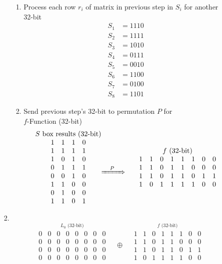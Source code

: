 \documentclass[12pt]{article}
\begin{document}
\begin{enumerate}
\begin{enumerate}
\begin{enumerate}
\begin{enumerate}
				\item
					Process each row $r_i$ of matrix in previous step in $S_i$ for another 32-bit
					\begin{align*}
					S_1 &= 1110\\
					S_2 &= 1111\\
					S_3 &= 1010\\
					S_4 &= 0111\\
					S_5 &= 0010\\
					S_6 &= 1100\\
					S_7 &= 0100\\
					S_8 &= 1101
					\end{align*}
					
				\item
					Send previous step's 32-bit to permutation $P$ for \\
					$f$-Function (32-bit)
					\[
					\stackrel{\mbox{$S$ box results (32-bit)}}{
					\begin{matrix}
						1&1&1&0\\
						1&1&1&1\\
						1&0&1&0\\
						0&1&1&1\\
						0&0&1&0\\
						1&1&0&0\\
						0&1&0&0\\
						1&1&0&1
					\end{matrix}}
					\xRightarrow{\quad P\quad}\quad\quad
					\stackrel{\mbox{$f$ (32-bit)}}{
					\begin{matrix}
						1&1&0&1&1&1&0&0\\
						1&1&0&1&1&0&0&0\\
						1&1&0&1&1&0&1&1\\
						1&0&1&1&1&1&0&0
					\end{matrix}}
					\]
				\end{enumerate}
				
			\newpage\item
				\quad\\
				\[
				\stackrel{\mbox{$L_0$ (32-bit)}}{
					\begin{matrix}
						0&0&0&0&0&0&0&0\\
						0&0&0&0&0&0&0&0\\
						0&0&0&0&0&0&0&0\\
						0&0&0&0&0&0&0&0
					\end{matrix}}
				\quad\oplus\quad
					\stackrel{\mbox{$f$ (32-bit)}}{
					\begin{matrix}
						1&1&0&1&1&1&0&0\\
						1&1&0&1&1&0&0&0\\
						1&1&0&1&1&0&1&1\\
						1&0&1&1&1&1&0&0
					\end{matrix}}
				\]
				

\end{enumerate}
\end{enumerate}
\end{enumerate}
\end{document}
